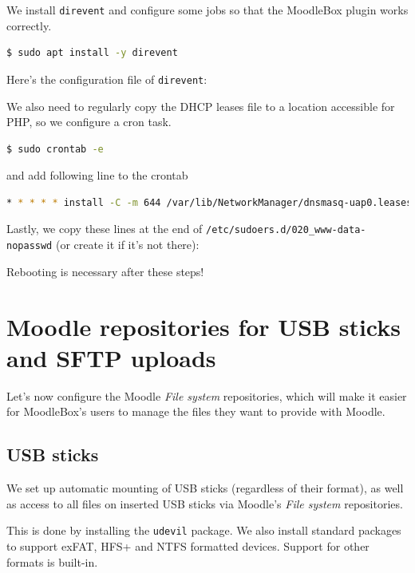 \documentclass[12pt]{article}
\begin{document}
We install \lstinline{direvent} and configure some jobs so that the MoodleBox plugin works correctly.
\begin{lstlisting}[language=bash]
$ sudo apt install -y direvent
\end{lstlisting}
Here's the configuration file of \lstinline{direvent}:


We also need to regularly copy the DHCP leases file to a location accessible for PHP, so we configure a cron task.
\begin{lstlisting}[language=bash]
$ sudo crontab -e
\end{lstlisting}
and add following line to the crontab
\begin{lstlisting}[language=bash]
* * * * * install -C -m 644 /var/lib/NetworkManager/dnsmasq-uap0.leases /tmp/dnsmasq.leases
\end{lstlisting}

Lastly, we copy these lines at the end of \lstinline{/etc/sudoers.d/020_www-data-nopasswd} (or create it if it's not there):


Rebooting is necessary after these steps!

\section{Moodle repositories for USB sticks and SFTP uploads}

Let's now configure the Moodle \textsl{File system} repositories, which will make it easier for MoodleBox's users to manage the files they want to provide with Moodle.

\subsection{USB sticks}

We set up automatic mounting of USB sticks (regardless of their format), as well as access to all files on inserted USB sticks via Moodle's \textsl{File system} repositories.

This is done by installing the \lstinline{udevil} package.
We also install standard packages to support exFAT, HFS+ and NTFS formatted devices.
Support for other formats is built-in.
\end{document}

